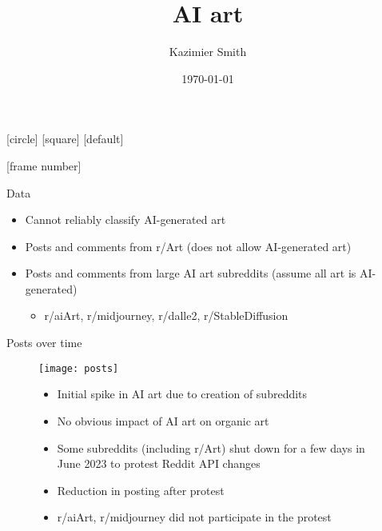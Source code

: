 \documentclass[aspectratio=169]{beamer}
\title{AI art}
\author{Kazimier Smith}
\date{\today}
\def\defaultscalefig{0.4}
\begin{document}
[circle]
[square]
[default]
\beamertemplatenavigationsymbolsempty

	
\begin{frame}[noframenumbering]
\titlepage
\end{frame}

[frame number]

\begin{frame}{Data}
	\begin{itemize}
		\item Cannot reliably classify AI-generated art
		\item Posts and comments from r/Art (does not allow AI-generated art)
		\item Posts and comments from large AI art subreddits (assume all art is AI-generated)
		\begin{itemize}
			\item r/aiArt, r/midjourney, r/dalle2, r/StableDiffusion
		\end{itemize}
	\end{itemize}
\end{frame}

\begin{frame}{Posts over time}
	\begin{figure}
		\begin{minipage}{0.45\textwidth}
			\centering
			\texttt{[image: posts]}
		\end{minipage}\hfill
		\begin{minipage}{0.45\textwidth}
			\centering
			\begin{itemize}
				\item Initial spike in AI art due to creation of subreddits
				\item No obvious impact of AI art on organic art
				\item Some subreddits (including r/Art) shut down for a few days in June 2023 to protest Reddit API changes
				\item Reduction in posting after protest
				\item r/aiArt, r/midjourney did not participate in the protest
			\end{itemize}
		\end{minipage}
	\end{figure}
\end{frame}
\end{document}
